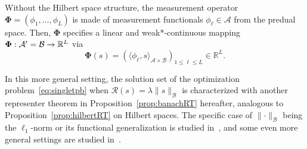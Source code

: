 \documentclass[12pt]{article}
\begin{document}
    Without the Hilbert space structure, the measurement operator $\bm{\Phi}= (\phi_1, \ldots, \phi_L)$ is made of measurement functionals $\phi_\ell \in \mathcal{A}$ from the predual space. Then, $\bm{\Phi}$ specifies a linear and weak*-continuous mapping $\bm{\Phi}: \mathcal{A}' =\mathcal{B} \rightarrow \mathbb{R}^L$ via 
    \begin{equation}
        \label{eq:phi-banach}
        \bm{\Phi} (s )= (\langle \phi_\ell, s \rangle_{\mathcal{A}\times\mathcal{B}})_{1\leq \ell \leq L} \in \mathbb{R}^L.
    \end{equation}

    In this more general setting, the solution set of the optimization problem~\eqref{eq:singletpb} when $\mathcal{R}(s) = \lambda \| s \|_{\mathcal{B}}$ is characterized with another representer theorem in Proposition~\ref{prop:banachRT} hereafter, analogous to Proposition~\ref{prop:hilbertRT} on Hilbert spaces.
    The specific case of $\lVert \cdot \rVert_\mathcal{B}$ being the $\ell_1$-norm or its functional generalization is studied in~\cite{Fisher1975,Unser2016representer,unser2017splines,bredies2020sparsity}, and some even more general settings are studied in~\cite{boyer2019representer,unser2019native}.


    
\end{document}
